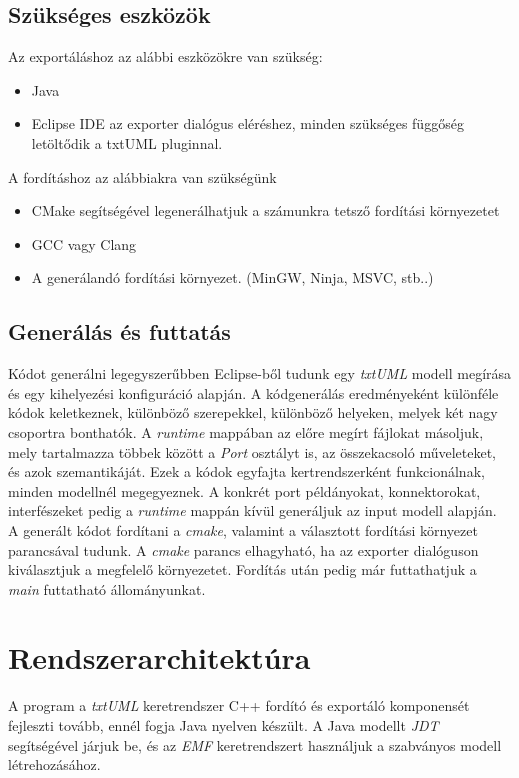 \documentclass[a4paper,12pt]{report}
\begin{document}
\subsection{Szükséges eszközök}
Az exportáláshoz az alábbi eszközökre van szükség:
\begin{itemize}
\item Java
\item Eclipse IDE az exporter dialógus eléréshez, minden szükséges függőség letöltődik a txtUML pluginnal.
\end{itemize}

A fordításhoz az alábbiakra van szükségünk
\begin{itemize}
\item CMake segítségével legenerálhatjuk a számunkra tetsző fordítási környezetet
\item GCC vagy Clang
\item A generálandó fordítási környezet. (MinGW, Ninja, MSVC, stb..)
\end{itemize}

\subsection{Generálás és futtatás}
Kódot generálni legegyszerűbben Eclipse-ből tudunk egy \textit{txtUML} modell megírása és egy kihelyezési konfiguráció alapján. A kódgenerálás eredményeként különféle kódok keletkeznek, különböző szerepekkel, különböző helyeken, melyek két nagy csoportra bonthatók.  A \textit{runtime} mappában az előre megírt fájlokat másoljuk, mely tartalmazza többek között a \textit{Port} osztályt is, az összekacsoló műveleteket, és azok szemantikáját. Ezek a kódok egyfajta kertrendszerként funkcionálnak, minden modellnél megegyeznek. A konkrét port példányokat, konnektorokat, interfészeket pedig a \textit{runtime} mappán kívül generáljuk az input modell alapján. \\

A generált kódot fordítani a \textit{cmake}, valamint a választott fordítási környezet parancsával tudunk. A \textit{cmake} parancs elhagyható, ha az exporter dialóguson kiválasztjuk a megfelelő környezetet. Fordítás után pedig már futtathatjuk a \textit{main} futtatható állományunkat.

\section{Rendszerarchitektúra}
A program a \textit{txtUML} keretrendszer C++ fordító és exportáló komponensét fejleszti tovább, ennél fogja Java nyelven készült. A Java modellt \textit{JDT} segítségével járjuk be, és az \textit{EMF} keretrendszert használjuk a szabványos modell létrehozásához. \\
\end{document}
